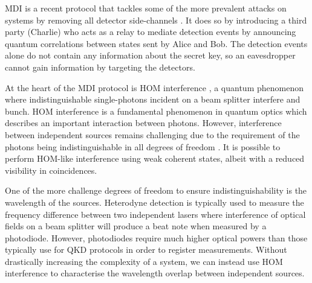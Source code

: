 \Ac{MDI} is a recent protocol that tackles some of the more prevalent attacks on systems by removing all detector side-channels \cite{mdi-qkd}. It does so by introducing a third party (Charlie) who acts as a relay to mediate detection events by announcing quantum correlations between states sent by Alice and Bob. The detection events alone do not contain any information about the secret key, so an eavesdropper cannot gain information by targeting the detectors. 

At the heart of the \Ac{MDI} protocol is \ac{HOM} interference \cite{HOM}, a quantum phenomenon where indistinguishable single-photons incident on a beam splitter interfere and bunch. \ac{HOM} interference is a fundamental phenomenon in quantum optics which describes an important interaction between photons. However, interference between independent sources remains challenging due to the requirement of the photons being indistinguishable in all degrees of freedom \cite{Xu2013}. It is possible to perform \ac{HOM}-like interference using weak coherent states, albeit with a reduced visibility in coincidences. 

One of the more challenge degrees of freedom to ensure indistinguishability is the wavelength of the sources. Heterodyne detection is typically used to measure the frequency difference between two independent lasers where interference of optical fields on a beam splitter will produce a beat note when measured by a photodiode. However, photodiodes require much higher optical powers than those typically use for QKD protocols in order to register measurements. Without drastically increasing the complexity of a system, we can instead use \ac{HOM} interference to characterise the wavelength overlap between independent sources.




